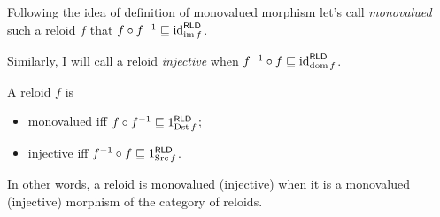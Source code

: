 Following the
idea of definition of monovalued morphism let's call \emph{monovalued}
such a reloid $f$ that $f\circ f^{-1}\sqsubseteq\operatorname{id}_{\operatorname{im} f}^{\mathsf{RLD}}$.

Similarly, I will
call a reloid \emph{injective} when $f^{-1}\circ f\sqsubseteq\operatorname{id}_{\operatorname{dom} f}^{\mathsf{RLD}}$.
\begin{obvious}
A reloid $f$ is
\begin{itemize}
\item monovalued iff $f\circ f^{-1}\sqsubseteq1_{\operatorname{Dst} f}^{\mathsf{RLD}}$;
\item injective iff $f^{-1}\circ f\sqsubseteq1_{\operatorname{Src} f}^{\mathsf{RLD}}$.
\end{itemize}
\end{obvious}
In other words, a reloid is monovalued (injective) when it is a monovalued
(injective) morphism of the category of reloids.

